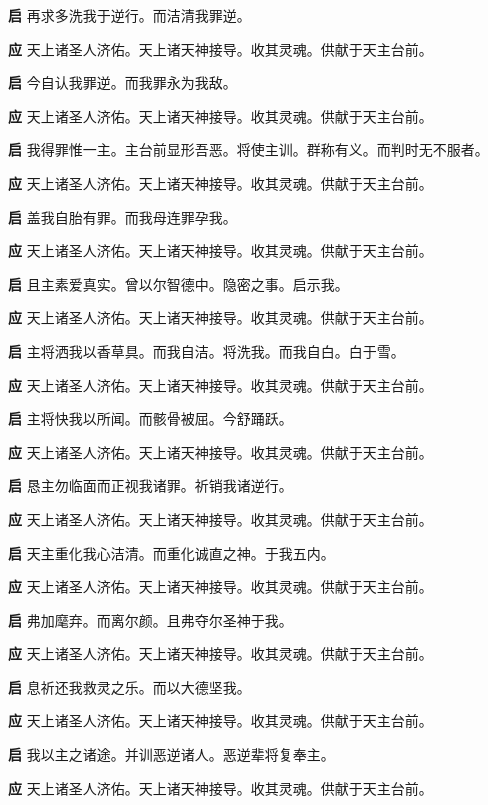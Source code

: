 \documentclass[UTF8,17pt]{ctexart}
\begin{document}
\textbf{启} \quad 再求多洗我于逆⾏。⽽洁清我罪逆。

\textbf{应} \quad 天上诸圣⼈济佑。天上诸天神接导。收其灵魂。供献于天主台前。

\textbf{启} \quad 今⾃认我罪逆。⽽我罪永为我敌。

\textbf{应} \quad 天上诸圣⼈济佑。天上诸天神接导。收其灵魂。供献于天主台前。

\textbf{启} \quad 我得罪惟⼀主。主台前显形吾恶。将使主训。群称有义。⽽判时⽆不服者。

\textbf{应} \quad 天上诸圣⼈济佑。天上诸天神接导。收其灵魂。供献于天主台前。

\textbf{启} \quad 盖我⾃胎有罪。⽽我母连罪孕我。

\textbf{应} \quad 天上诸圣⼈济佑。天上诸天神接导。收其灵魂。供献于天主台前。

\textbf{启} \quad 且主素爱真实。曾以尔智德中。隐密之事。启⽰我。

\textbf{应} \quad 天上诸圣⼈济佑。天上诸天神接导。收其灵魂。供献于天主台前。

\textbf{启} \quad 主将洒我以⾹草具。⽽我⾃洁。将洗我。⽽我⾃⽩。⽩于雪。

\textbf{应} \quad 天上诸圣⼈济佑。天上诸天神接导。收其灵魂。供献于天主台前。

\textbf{启} \quad 主将快我以所闻。⽽骸⾻被屈。今舒踊跃。

\textbf{应} \quad 天上诸圣⼈济佑。天上诸天神接导。收其灵魂。供献于天主台前。

\textbf{启} \quad 恳主勿临⾯⽽正视我诸罪。祈销我诸逆⾏。

\textbf{应} \quad 天上诸圣⼈济佑。天上诸天神接导。收其灵魂。供献于天主台前。

\textbf{启} \quad 天主重化我⼼洁清。⽽重化诚直之神。于我五内。

\textbf{应} \quad 天上诸圣⼈济佑。天上诸天神接导。收其灵魂。供献于天主台前。

\textbf{启} \quad 弗加麾弃。⽽离尔颜。且弗夺尔圣神于我。

\textbf{应} \quad 天上诸圣⼈济佑。天上诸天神接导。收其灵魂。供献于天主台前。

\textbf{启} \quad 息祈还我救灵之乐。⽽以⼤德坚我。

\textbf{应} \quad 天上诸圣⼈济佑。天上诸天神接导。收其灵魂。供献于天主台前。

\textbf{启} \quad 我以主之诸途。并训恶逆诸⼈。恶逆辈将复奉主。

\textbf{应} \quad 天上诸圣⼈济佑。天上诸天神接导。收其灵魂。供献于天主台前。
\end{document}
